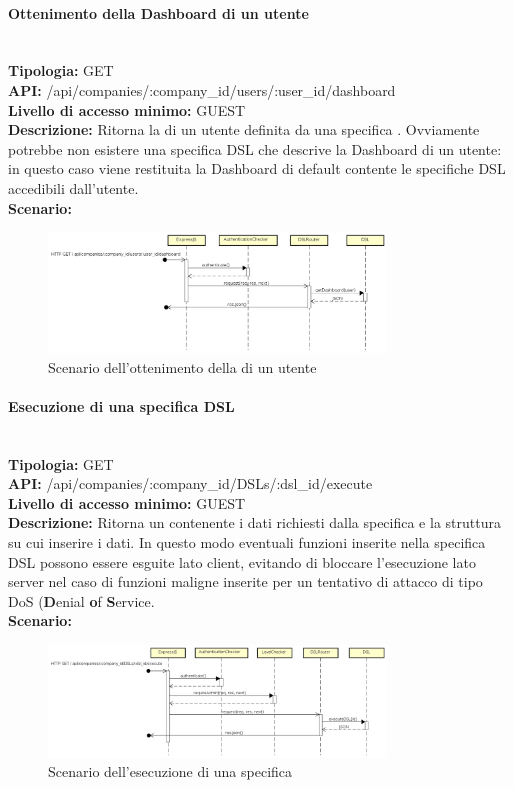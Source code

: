 \newpage
\paragraph{Ottenimento della Dashboard di un utente}\mbox{}\\
\textbf{Tipologia:} GET \\
\textbf{API:} /api/companies/:company\_id/users/:user\_id/dashboard \\
\textbf{Livello di accesso minimo:} GUEST \\
\textbf{Descrizione:} Ritorna la  di un utente definita da una specifica . Ovviamente potrebbe non esistere una specifica DSL che descrive la Dashboard di un utente: in questo caso viene restituita la Dashboard di default contente le specifiche DSL accedibili dall'utente. \\
\textbf{Scenario:}  
\begin{figure}[H]
\centering
\includegraphics[width=0.8\textwidth]{res/sections/backend/sequence/(GET)dashboard.png}
\caption{Scenario dell'ottenimento della  di un utente}
\end{figure}

\newpage
\paragraph{Esecuzione di una specifica DSL}\mbox{}\\
\textbf{Tipologia:} GET \\
\textbf{API:} /api/companies/:company\_id/DSLs/:dsl\_id/execute \\
\textbf{Livello di accesso minimo:} GUEST \\
\textbf{Descrizione:} Ritorna un  contenente i dati richiesti dalla specifica  e la struttura su cui inserire i dati. In questo modo eventuali funzioni inserite nella specifica DSL possono essere esguite lato client, evitando di bloccare l'esecuzione lato server nel caso di funzioni maligne inserite per un tentativo di attacco di tipo DoS (\textbf{D}enial \textbf{o}f \textbf{S}ervice. \\
\textbf{Scenario:} 
\begin{figure}[H]
\centering
\includegraphics[width=0.8\textwidth]{res/sections/backend/sequence/(GET)dslByIDex.png}
\caption{Scenario dell'esecuzione di una specifica }
\end{figure}

